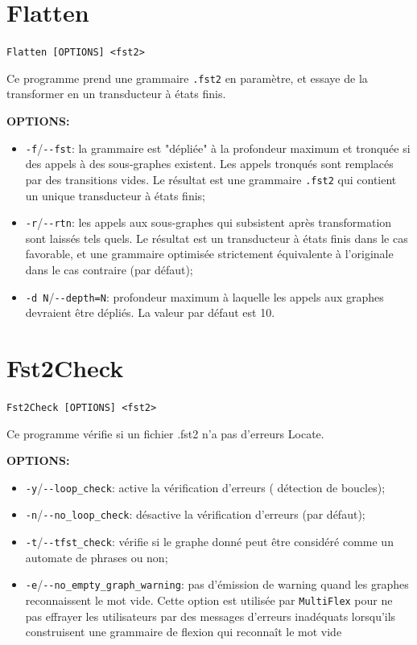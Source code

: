\section{Flatten}
\verb+Flatten [OPTIONS] <fst2>+

\bigskip
\noindent Ce programme prend une grammaire \verb+.fst2+ en paramètre, et essaye de la transformer
en un transducteur à états finis.


\bigskip
\noindent \textbf{OPTIONS:}
\begin{itemize}
\item \verb+-f+/\verb+--fst+: la grammaire est "dépliée" à la profondeur maximum et tronquée si des
	appels à des sous-graphes existent. Les appels tronqués sont remplacés par des transitions
	vides. Le résultat est une grammaire \verb+.fst2+ qui contient un unique transducteur à
	états finis;

\item \verb+-r+/\verb+--rtn+: les appels aux sous-graphes qui subsistent après transformation sont
	laissés tels quels. Le résultat est un transducteur à états finis dans le cas favorable, et
	une grammaire optimisée strictement équivalente à l'originale dans le cas contraire (par
		défaut);

\item \verb+-d N+/\verb+--depth=N+: profondeur maximum à laquelle les appels aux graphes devraient
	être dépliés. La valeur par défaut est 10.
\end{itemize}







\section{Fst2Check}
\verb+Fst2Check [OPTIONS] <fst2>+

\bigskip
\noindent Ce programme vérifie si un fichier .fst2 n'a pas d'erreurs Locate.

\bigskip
\noindent \textbf{OPTIONS:}
\begin{itemize}
\item \verb+-y+/\verb+--loop_check+: active la vérification d'erreurs (
		détection de boucles);
\item \verb+-n+/\verb+--no_loop_check+: désactive la vérification d'erreurs (par défaut);
\item \verb+-t+/\verb+--tfst_check+: vérifie si le  graphe donné peut être considéré comme un
	automate de phrases ou non;
\item \verb+-e+/\verb+--no_empty_graph_warning+: pas d'émission de warning 
	quand les graphes reconnaissent le mot vide. Cette option est utilisée par \verb+MultiFlex+
	pour ne pas effrayer les utilisateurs par des messages d'erreurs inadéquats lorsqu'ils
	construisent une grammaire de flexion qui reconnaît le mot vide
\end{itemize}

